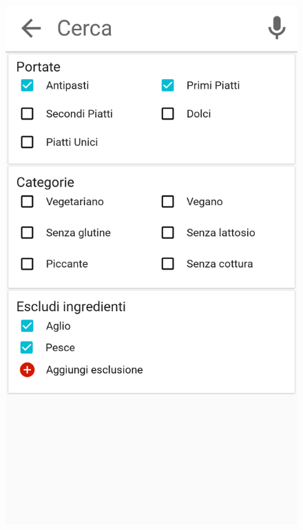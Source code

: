 \begin{figure}[H]
	\begin{minipage}{.49\textwidth}
		\includegraphics[width=\textwidth]{img/wireframe/search_page_aggiunto_pesce.png}
	\end{minipage}
	\begin{minipage}{.49\textwidth}

\end{minipage}
\end{figure}

